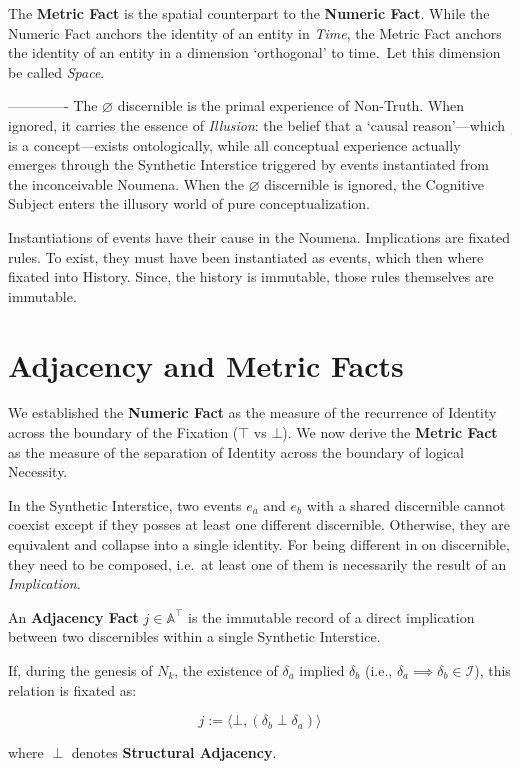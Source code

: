 The \textbf{Metric Fact} is the spatial counterpart to the \textbf{Numeric
Fact}. While the Numeric Fact anchors the identity of an entity in
\textit{Time}, the Metric Fact anchors the identity of an entity in a dimension
`orthogonal' to time.\ Let this dimension be called  \textit{Space}. 

-------------
The $\varnothing$ discernible is the primal experience of Non-Truth. When
ignored, it carries the essence of \textit{Illusion}: the belief that a
`causal reason'---which is a concept---exists ontologically, while all
conceptual experience actually emerges through the Synthetic Interstice
triggered by events instantiated from the inconceivable Noumena. When the
$\varnothing$ discernible is ignored, the Cognitive Subject enters the
illusory world of pure conceptualization.


Instantiations of events have their cause in the Noumena. Implications are
fixated rules. To exist, they must have been instantiated as events, which then
where fixated into History. Since, the history is immutable, those rules
themselves are immutable.

\section{Adjacency and Metric Facts}

We established the \textbf{Numeric Fact} as the measure of the recurrence of
Identity across the boundary of the Fixation ($\top$ vs $\bot$). We now derive
the \textbf{Metric Fact} as the measure of the separation of Identity across
the boundary of logical Necessity.

In the Synthetic Interstice, two events $e_a$ and $e_b$ with a shared
discernible cannot coexist except if they posses at least one different
discernible. Otherwise, they are equivalent and collapse into a single
identity. For being different in on discernible, they need to be composed,
i.e.\ at least one of them is necessarily the result of an {\it Implication}. 

\begin{formalism}

    An \textbf{Adjacency Fact} $j \in \mathbb{A}^\top$ is the immutable record
    of a direct implication between two discernibles within a single Synthetic
    Interstice.
    
    If, during the genesis of $N_k$, the existence of $\delta_a$ implied
    $\delta_b$ (i.e., $\delta_a \implies \delta_b \in \mathcal{I}$), this
    relation is fixated as:

    \begin{equation}
        j := \langle \bot, (\delta_b \perp \delta_a) \rangle
    \end{equation}

    where $\perp$ denotes \textbf{Structural Adjacency}.

\end{formalism}

